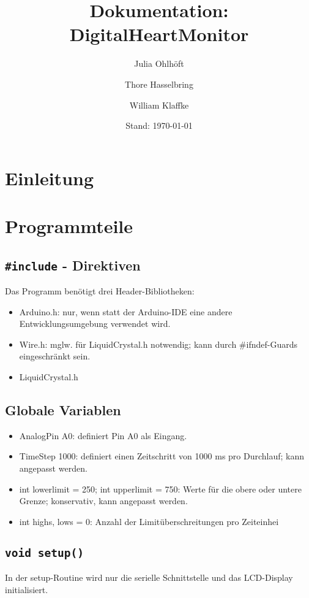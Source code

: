 \documentclass[10pt, a4paper]{article}
\title{Dokumentation: DigitalHeartMonitor}
\author[1]{Julia Ohlhöft}
\author[1]{Thore Hasselbring}
\author[1]{William Klaffke}
\affil[1]{TH Lübeck}
\date{Stand: \today}
\begin{document}
\maketitle

\tableofcontents

\section{Einleitung}

\section{Programmteile}

\subsection{\texttt{\#include} - Direktiven}
Das Programm benötigt drei Header-Bibliotheken:
\begin{itemize}
	\item Arduino.h: nur, wenn statt der Arduino-IDE eine andere Entwicklungsumgebung verwendet wird.
	\item Wire.h: mglw. für LiquidCrystal.h notwendig; kann durch \#ifndef-Guards eingeschränkt sein.
	\item LiquidCrystal.h
\end{itemize}	

\subsection{Globale Variablen}
\begin{itemize}
	\item AnalogPin A0: definiert Pin A0 als Eingang.
	\item TimeStep 1000: definiert einen Zeitschritt von 1000 ms pro Durchlauf; kann angepasst werden.
	\item int lowerlimit = 250; int upperlimit = 750: Werte für die obere oder untere Grenze; konservativ, kann angepasst werden.
	\item int highs, lows = 0: Anzahl der Limitüberschreitungen pro Zeiteinhei
\end{itemize}

\subsection{\texttt{void setup()}}
In der setup-Routine wird nur die serielle Schnittstelle und das LCD-Display initialisiert.
\end{document}
